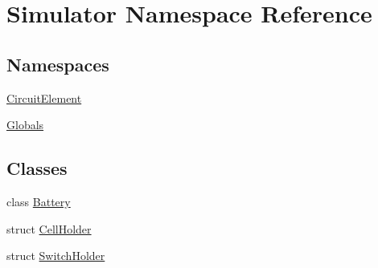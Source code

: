 \hypertarget{namespace_simulator}{}\section{Simulator Namespace Reference}
\label{namespace_simulator}
\subsection*{Namespaces}
\begin{DoxyCompactItemize}
\item 
 \hyperlink{namespace_simulator_1_1_circuit_element}{Circuit\+Element}
\item 
 \hyperlink{namespace_simulator_1_1_globals}{Globals}
\end{DoxyCompactItemize}
\subsection*{Classes}
\begin{DoxyCompactItemize}
\item 
class \hyperlink{class_simulator_1_1_battery}{Battery}
\item 
struct \hyperlink{struct_simulator_1_1_cell_holder}{Cell\+Holder}
\item 
struct \hyperlink{struct_simulator_1_1_switch_holder}{Switch\+Holder}
\end{DoxyCompactItemize}
